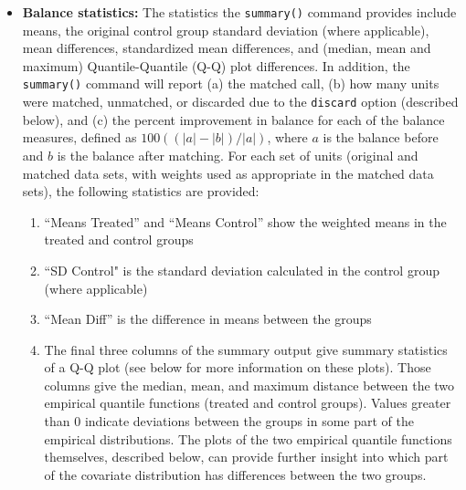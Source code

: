 \begin{itemize}
\item {\bf Balance statistics:} The statistics the \texttt{summary()}
  command provides include means, the original control group standard deviation (where applicable), 
  mean differences, standardized mean
  differences, and (median, mean and maximum) Quantile-Quantile (Q-Q)
  plot differences.  In addition, the \texttt{summary()} command will
  report (a) the matched call, (b) how many units were matched,
  unmatched, or discarded due to the \texttt{discard} option
  (described below), and (c) the percent improvement in balance for
  each of the balance measures, defined as $100((|a|-|b|)/|a|)$, where
  $a$ is the balance before and $b$ is the balance after matching.
  For each set of units (original and matched data sets, with weights
  used as appropriate in the matched data sets), the
  following statistics are provided:
\begin{enumerate}
  \item ``Means Treated'' and ``Means Control'' show the weighted
    means in the treated and control groups
  \item ``SD Control" is the standard deviation calculated in the control group (where applicable)
  \item ``Mean Diff'' is the difference in means between the groups
  \item The final three columns of the summary output give summary
    statistics of a Q-Q plot (see below for more information on these
    plots). Those columns give the median, mean, and maximum distance
    between the two empirical quantile functions (treated and control
    groups).  Values greater than 0 indicate deviations between the
    groups in some part of the empirical distributions.  The plots of
    the two empirical quantile functions themselves, described below,
    can provide further insight into which part of the covariate
    distribution has differences between the two groups.
\end{enumerate}


\end{itemize}
